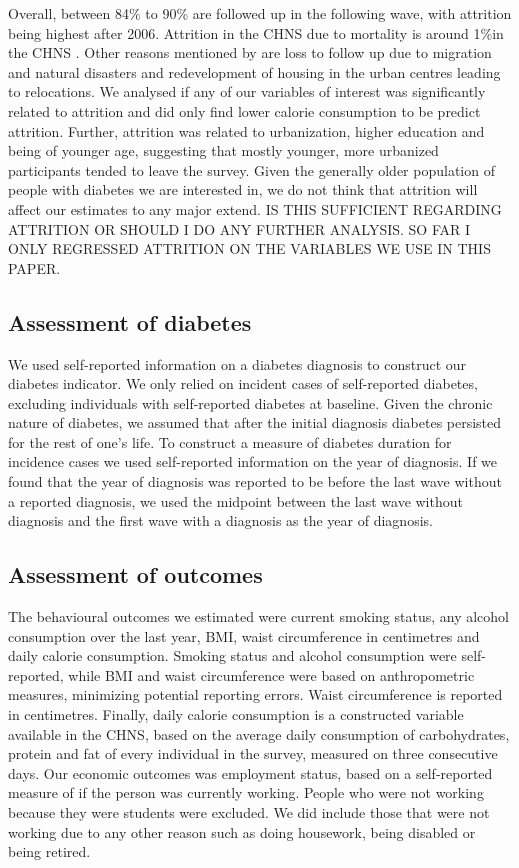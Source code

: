 Overall, between 84\% to 90\% are followed up in the following wave, with attrition being highest after 2006. Attrition in the \ac{CHNS} due to mortality is around 1\%in the \ac{CHNS} \parencite{Popkin2010}. Other reasons mentioned by \textcite{Popkin2010} are loss to follow up due to migration and natural disasters and redevelopment of housing in the urban centres leading to relocations. We analysed if any of our variables of interest was significantly related to attrition and did only find lower calorie consumption to be predict attrition. Further, attrition was related to urbanization, higher education and being of younger age, suggesting that mostly younger, more urbanized participants tended to leave the survey. Given the generally older population of people with diabetes we are interested in, we do not think that attrition will affect our estimates to any major extend. IS THIS SUFFICIENT REGARDING ATTRITION OR SHOULD I DO ANY FURTHER ANALYSIS. SO FAR I ONLY REGRESSED ATTRITION ON THE VARIABLES WE USE IN THIS PAPER.


\subsection{Assessment of diabetes}

We used self-reported information on a diabetes diagnosis to construct our diabetes indicator. We only relied on incident cases of self-reported diabetes, excluding individuals with self-reported diabetes at baseline. Given the chronic nature of diabetes, we assumed that after the initial diagnosis diabetes persisted for the rest of one's life. To construct a measure of diabetes duration for incidence cases we used self-reported information on the year of diagnosis. If we found that the year of diagnosis was reported to be before the last wave without a reported diagnosis, we used the midpoint between the last wave without diagnosis and the first wave with a diagnosis as the year of diagnosis. 

\subsection{Assessment of outcomes}

The behavioural outcomes we estimated were current smoking status, any alcohol consumption over the last year, \ac{BMI}, waist circumference in centimetres and daily calorie consumption. Smoking status and alcohol consumption were self-reported, while \ac{BMI} and waist circumference were based on anthropometric measures, minimizing potential reporting errors. Waist circumference is reported in centimetres. Finally, daily calorie consumption is a constructed variable available in the \ac{CHNS}, based on the average daily consumption of carbohydrates, protein and fat of every individual in the survey, measured on three consecutive days. Our economic outcomes was employment status, based on a self-reported measure of if the person was currently working. People who were not working because they were students were excluded. We did include those that were not working due to any other reason such as doing housework, being disabled or being retired.


